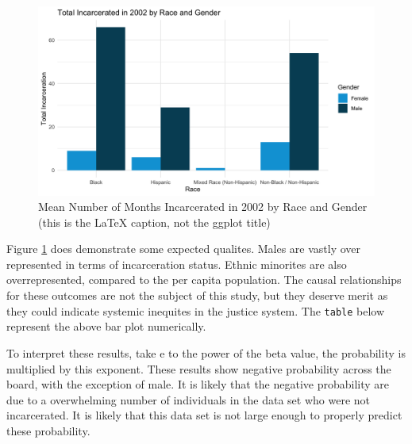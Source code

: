 \documentclass{article}
\begin{document}
\begin{figure}[H]
    \begin{center}
        \includegraphics[width=.85\textwidth]{../figures/incarcerated_by_racegender.png}
    \end{center}
    \caption{Mean Number of Months Incarcerated in 2002 by Race and Gender (this is the LaTeX caption, not the ggplot title)}
    \label{fig:graph}
\end{figure}


Figure \ref{fig:graph} does demonstrate some expected qualites. Males are vastly over represented in terms of incarceration status. Ethnic minorites are also overrepresented, compared to the per capita population. The causal relationships for these outcomes are not the subject of this study, but they deserve merit as they could indicate systemic inequites in the justice system. The \texttt{table} below represent the above bar plot numerically.





To interpret these results, take e to the power of the beta value, the probability is multiplied by this exponent. These results show negative probability  across the board, with the exception of male. It is likely that the negative probability  are due to a overwhelming number of individuals in the data set who were not incarcerated. It is likely that this data set is not large enough to properly predict these probability.
\end{document}
